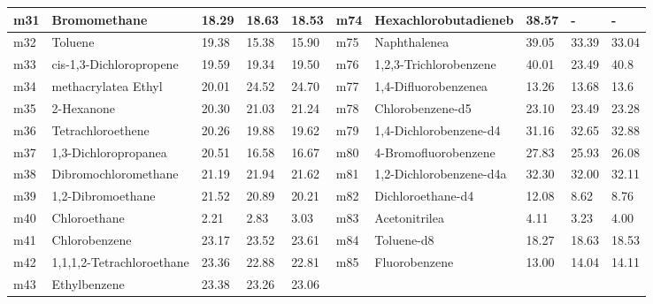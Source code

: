 \documentclass[11pt]{article}
\begin{document}
\begin{table}
{\begin{tabular}{|l|l|l|l|l|l|l|l|l|l|}
\hline
m31 & Bromomethane & 18.29 & 18.63 & 18.53 & m74 & Hexachlorobutadieneb & 38.57 & - & - \\
\hline
m32 & Toluene & 19.38 & 15.38 & 15.90 & m75 & Naphthalenea & 39.05 & 33.39 & 33.04 \\
\hline
m33 & cis-1,3-Dichloropropene & 19.59 & 19.34 & 19.50 & m76 & 1,2,3-Trichlorobenzene & 40.01 & 23.49 & 40.8 \\
\hline
m34 & methacrylatea Ethyl & 20.01 & 24.52 & 24.70 & m77 & 1,4-Difluorobenzenea & 13.26 & 13.68 & 13.6 \\
\hline
m35 & 2-Hexanone & 20.30 & 21.03 & 21.24 & m78 & Chlorobenzene-d5 & 23.10 & 23.49 & 23.28 \\
\hline
m36 & Tetrachloroethene & 20.26 & 19.88 & 19.62 & m79 & 1,4-Dichlorobenzene-d4 & 31.16 & 32.65 & 32.88 \\
\hline
m37 & 1,3-Dichloropropanea & 20.51 & 16.58 & 16.67 & m80 & 4-Bromofluorobenzene & 27.83 & 25.93 & 26.08 \\
\hline
m38 & Dibromochloromethane & 21.19 & 21.94 & 21.62 & m81 & 1,2-Dichlorobenzene-d4a & 32.30 & 32.00 & 32.11 \\
\hline
m39 & 1,2-Dibromoethane & 21.52 & 20.89 & 20.21 & m82 & Dichloroethane-d4 & 12.08 & 8.62 & 8.76 \\
\hline
m40 & Chloroethane & 2.21 & 2.83 & 3.03 & m83 & Acetonitrilea & 4.11 & 3.23 & 4.00 \\
\hline
m41 & Chlorobenzene & 23.17 & 23.52 & 23.61 & m84 & Toluene-d8 & 18.27 & 18.63 & 18.53 \\
\hline
m42 & 1,1,1,2-Tetrachloroethane & 23.36 & 22.88 & 22.81 & m85 & Fluorobenzene & 13.00 & 14.04 & 14.11 \\
\hline
m43 & Ethylbenzene & 23.38 & 23.26 & 23.06 \\
\hline
\end{tabular}
}%
\end{table}
\end{document}
